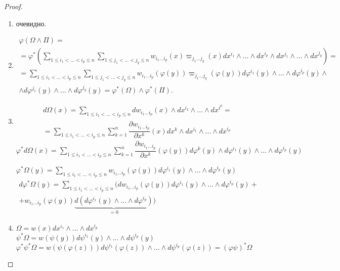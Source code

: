 \begin{proof}\ 
	\begin{enumerate}
		\item очевидно.
		\item\begin{multline*}
			\varphi(\Omega\wedge\Pi)=\\=\varphi^*\left(\sum\limits_{1\leqslant i_1<\ldots<i_p\leqslant n}\sum\limits_{1\leqslant j_1<\ldots<j_q\leqslant n}w_{i_1\ldots i_p}(x)\varpi_{j_1\ldots j_q}(x)dx^{i_1}\wedge\ldots\wedge dx^{i_p}\wedge dx^{j_1}\wedge\ldots\wedge dx^{j_q}\right)=\\=\sum\limits_{1\leqslant i_1<\ldots<i_p\leqslant n}\sum\limits_{1\leqslant j_1<\ldots<j_q\leqslant n}w_{i_1\ldots i_p}(\varphi(y))\varpi_{j_1\ldots j_q}(\varphi(y))d\varphi^{i_1}(y)\wedge\ldots\wedge d\varphi^{i_p}(y)\wedge \\ \wedge d\varphi^{j_1}(y)\wedge\ldots\wedge d\varphi^{j_q}(y)=\varphi^*(\Omega)\wedge \varphi^*(\Pi).
		\end{multline*} 
		\item 
		\begin{multline*}
			d\Omega(x)=\sum\limits_{1\leqslant i_1<\ldots<i_p\leqslant n}dw_{i_1\ldots i_p}(x)\wedge dx^{i_1}\wedge\ldots\wedge dx^{i^p}=
			\\
			=\sum\limits_{1\leqslant i_1<\ldots<i_p\leqslant n}\sum\limits_{k=1}^n\dfrac{\partial w_{i_1\ldots i_p}}{\partial x^k}(x)dx^{k}\wedge dx^{i_1}\wedge\ldots\wedge dx^{i_p}
		\end{multline*}
		$\varphi^*d\Omega(x)=\sum\limits_{1\leqslant i_1<\ldots<i_p\leqslant n}\sum\limits_{k=1}^n\dfrac{\partial w_{i_1\ldots i_p}}{\partial x^k}(\varphi(y))d\varphi^k(y)\wedge d\varphi^{i_1}(y)\wedge\ldots\wedge d\varphi^{i_p}(y)$
		
		$\varphi^*\Omega(y) = \sum\limits_{1\leqslant i_1<\ldots<i_p\leqslant n} w_{i_1\ldots i_p}(\varphi(y))d\varphi^{i_1}(y)\wedge\ldots\wedge d\varphi^{i_p}(y)$
		\begin{multline*}
			d\varphi^*\Omega(y)=\sum\limits_{1\leqslant i_1<\ldots<i_p\leqslant n}(dw_{i_1\ldots i_p}(\varphi(y))d\varphi^{i_1}(y)\wedge\ldots\wedge d\varphi^{i_p}(y)+\\+w_{i_1\ldots i_p}(\varphi(y))\underbrace{d(d\varphi^{i_1}(y)\wedge\ldots\wedge d\varphi^{i_p})}_{=0})
		\end{multline*}
	\item $\Omega=w(x)dx^{i_1}\wedge\ldots\wedge dx^{i_p}$ \\
	$\psi^*\Omega=w(\psi(y))d\psi^{i_1}(y)\wedge\ldots\wedge d\psi^{i_p}(y)$ \\
	$\varphi^*\psi^*\Omega=w(\psi(\varphi(z)))d\psi^{i_1}(\varphi(z))\wedge\ldots\wedge d\psi^{i_p}(\varphi(z))=(\varphi\psi)^*\Omega$
	\end{enumerate}
\end{proof}


